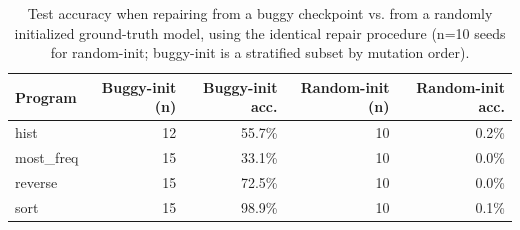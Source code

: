 \begin{table}[t]
\centering
\caption{Test accuracy when repairing from a buggy checkpoint vs. from a randomly initialized ground-truth model, using the identical repair procedure (n=10 seeds for random-init; buggy-init is a stratified subset by mutation order).}
\label{tab:init-controls}
\begin{tabular}{lrrrr}
\toprule
Program & Buggy-init (n) & Buggy-init acc. & Random-init (n) & Random-init acc. \\
\midrule
hist & 12 & 55.7\% & 10 & 0.2\% \\
most_freq & 15 & 33.1\% & 10 & 0.0\% \\
reverse & 15 & 72.5\% & 10 & 0.0\% \\
sort & 15 & 98.9\% & 10 & 0.1\% \\
\bottomrule
\end{tabular}
\end{table}
